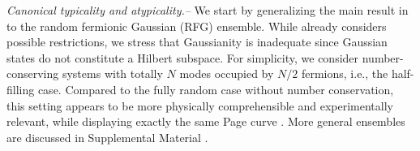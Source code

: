 \documentclass[twocolumn,english,prl,aps,superscriptaddress,amsmath,amssymb,floatfix]{revtex4-2}
\begin{document}
\begin{comment}
The Page curve for RFG ensemble was first obtained in \citep{Bianchi2021a}
and later generalized to charge conserved symmetric case in \citep{Bianchi2021}.
It still has volume law but with a different factor and variance from
\textcolor{red}{the interacting} %
one. Besides, this random quantum resource has many applications
in quantum information process \citep{Circuit_complexity_free_fermion,fermionicTomograph1}
and may also have advantage in quantum metrology when generalizing
\citep{Bosonic_metrology} to fermionic system \citep{fermionic_Gauss_metrology}.
Therefore, for those practical reasons we need to consider how the
Page curve can appear in real physical system rather than the manifold
of random matrices\citep{Kaneko2020,Nakata2017,Ho2022,Lucas2022}.

In this letter, we first derive the canonical typicality of RFG ensemble. We will use our typicality result to illustrate the difference of Page
curve between free and \textcolor{red}{interacting} %
fermionic system. Then, we propose
a simple class of time-independent Hamiltonian with translational
symmetry, which can dynamically emerge the Page curve for RFG ensemble
to a very high accuracy. Some of those previous works \citep{Kaneko2020,Nakata2017,Ho2022,Lucas2022}
consider non-integrable systems or floquet systems which are hard
to keep track of analytically and only have numerical results. Others
require local physical systems plus infinite degrees of ancilla. Our
proposal is much simpler than those. It has no reference to ancilla
and is a pure global property.    

\end{comment}
\emph{Canonical typicality and atypicality.--}%
We start by generalizing %
the main result in \citep{Popescu2006} to the random fermionic Gaussian (RFG) ensemble. While \citep{Popescu2006} already considers possible restrictions, we stress that Gaussianity is inadequate since Gaussian states do not constitute a Hilbert subspace. 
For simplicity, we %
consider number-conserving systems with totally $N$ modes occupied by $N/2$ fermions, i.e., the half-filling case. Compared to the fully random case without number conservation, this setting appears to be more physically comprehensible and experimentally relevant, while displaying exactly the same Page curve %
\citep{Bianchi2021a,Bianchi2021}. %
More general ensembles are discussed %
in Supplemental Material \cite{SM}. 
\end{document}
